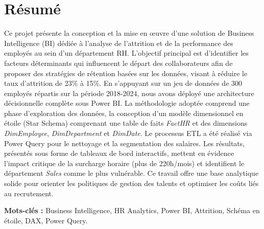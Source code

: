 \chapter*{Résumé}

\begin{onehalfspace}
Ce projet présente la conception et la mise en œuvre d'une solution de Business Intelligence (BI) dédiée à l'analyse de l'attrition et de la performance des employés au sein d'un département RH. L'objectif principal est d'identifier les facteurs déterminants qui influencent le départ des collaborateurs afin de proposer des stratégies de rétention basées sur les données, visant à réduire le taux d'attrition de 23\% à 15\%. En s'appuyant sur un jeu de données de 300 employés répartis sur la période 2018-2024, nous avons déployé une architecture décisionnelle complète sous Power BI. La méthodologie adoptée comprend une phase d'exploration des données, la conception d'un modèle dimensionnel en étoile (Star Schema) comprenant une table de faits \textit{FactHR} et des dimensions \textit{DimEmployee}, \textit{DimDepartment} et \textit{DimDate}. Le processus ETL a été réalisé via Power Query pour le nettoyage et la segmentation des salaires. Les résultats, présentés sous forme de tableaux de bord interactifs, mettent en évidence l'impact critique de la surcharge horaire (plus de 220h/mois) et identifient le département \textit{Sales} comme le plus vulnérable. Ce travail offre une base analytique solide pour orienter les politiques de gestion des talents et optimiser les coûts liés au recrutement.

\textbf{Mots-clés :} Business Intelligence, HR Analytics, Power BI, Attrition, Schéma en étoile, DAX, Power Query.
\end{onehalfspace}
